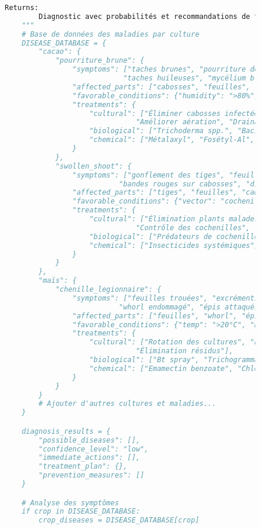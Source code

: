 \begin{figure}[H]
\begin{lstlisting}[language=Python, caption=Implémentation d'outils spécialisés pour l'agriculture]
    Returns:
        Diagnostic avec probabilités et recommandations de traitement
    """
    # Base de données des maladies par culture
    DISEASE_DATABASE = {
        "cacao": {
            "pourriture_brune": {
                "symptoms": ["taches brunes", "pourriture des cabosses",
                            "taches huileuses", "mycélium blanc"],
                "affected_parts": ["cabosses", "feuilles", "tronc"],
                "favorable_conditions": {"humidity": ">80%", "temp": "20-30°C"},
                "treatments": {
                    "cultural": ["Éliminer cabosses infectées",
                               "Améliorer aération", "Drainage"],
                    "biological": ["Trichoderma spp.", "Bacillus subtilis"],
                    "chemical": ["Métalaxyl", "Fosétyl-Al", "Hydroxyde de cuivre"]
                }
            },
            "swollen_shoot": {
                "symptoms": ["gonflement des tiges", "feuilles déformées",
                           "bandes rouges sur cabosses", "die-back"],
                "affected_parts": ["tiges", "feuilles", "cabosses"],
                "favorable_conditions": {"vector": "cochenilles"},
                "treatments": {
                    "cultural": ["Élimination plants malades",
                               "Contrôle des cochenilles", "Replantation"],
                    "biological": ["Prédateurs de cochenilles"],
                    "chemical": ["Insecticides systémiques"]
                }
            }
        },
        "maïs": {
            "chenille_legionnaire": {
                "symptoms": ["feuilles trouées", "excréments visibles",
                           "whorl endommagé", "épis attaqués"],
                "affected_parts": ["feuilles", "whorl", "épis"],
                "favorable_conditions": {"temp": ">20°C", "humidity": "moderate"},
                "treatments": {
                    "cultural": ["Rotation des cultures", "Labour profond",
                               "Élimination résidus"],
                    "biological": ["Bt spray", "Trichogramma", "Neem"],
                    "chemical": ["Emamectin benzoate", "Chlorantraniliprole"]
                }
            }
        }
        # Ajouter d'autres cultures et maladies...
    }

    diagnosis_results = {
        "possible_diseases": [],
        "confidence_level": "low",
        "immediate_actions": [],
        "treatment_plan": {},
        "prevention_measures": []
    }

    # Analyse des symptômes
    if crop in DISEASE_DATABASE:
        crop_diseases = DISEASE_DATABASE[crop]


\end{lstlisting}
\end{figure}
